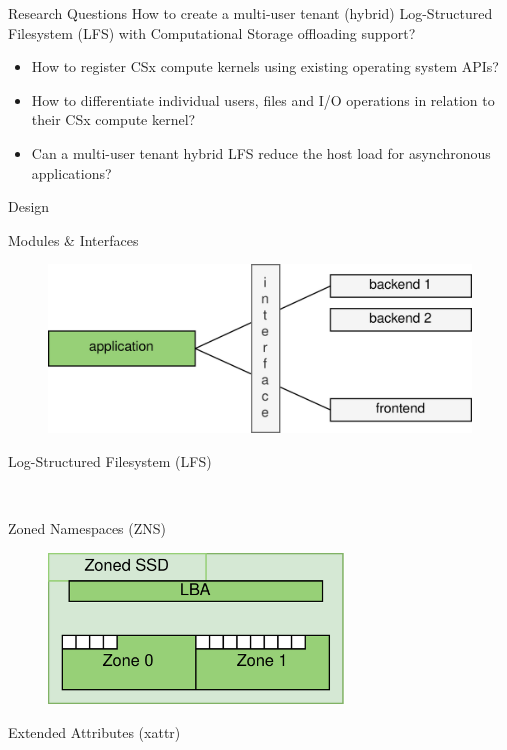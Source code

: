 \documentclass{beamer}
\newcommand\FourQuad[4]{%
    \begin{minipage}[b][.35\textheight][t]{.47\textwidth}#1\end{minipage}\hfill%
    \begin{minipage}[b][.35\textheight][t]{.47\textwidth}#2\end{minipage}\\[0.5em]
    \begin{minipage}[b][.35\textheight][t]{.47\textwidth}#3\end{minipage}\hfill
    \begin{minipage}[b][.35\textheight][t]{.47\textwidth}#4\end{minipage}%
}
\begin{document}
\begin{frame}{Research Questions}
	\begingroup
	\small
		How to create a multi-user tenant (hybrid) Log-Structured Filesystem
		(LFS) with Computational Storage offloading support?
	\begin{itemize}
		\item How to register CSx compute kernels using existing operating 
			  system APIs?
  		\item How to differentiate individual users, files and I/O operations in
			  relation to their CSx compute kernel?
		\item Can a multi-user tenant hybrid LFS reduce the host load for
              asynchronous applications?
	\end{itemize}
	\endgroup
\end{frame}

%
%
%
%
%
%
\begin{frame}{Design}
	\begingroup
	\small
	
	\FourQuad%
		{\centering Modules \& Interfaces
		\begin{figure}
			\centering
			\includegraphics[width=1.0\textwidth]{resources/images/modules-interfaces.png}
		\end{figure}
		}
		{\centering Log-Structured Filesystem (LFS)

		}
		{\centering Zoned Namespaces (ZNS)
		\begin{figure}
			\centering
			\includegraphics[width=0.7\textwidth]{resources/images/zns-simple.png}
		\end{figure}
		}
		{\centering Extended Attributes (xattr)
		}
	\endgroup
\end{frame}
\end{document}
